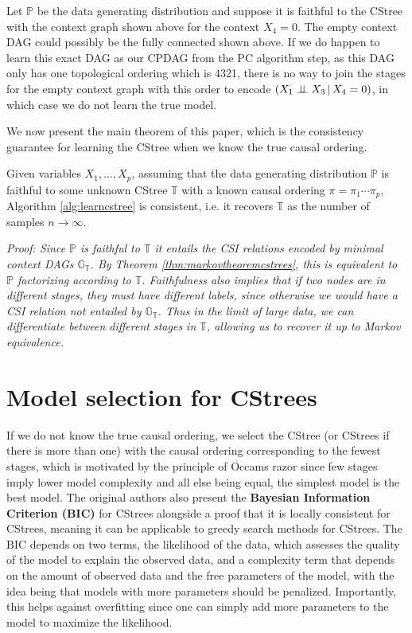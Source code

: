 \documentclass{tufte-book}
\begin{document}
Let \(\mathbb{P}\) be the data generating distribution and suppose it is faithful to the CStree with the context graph shown above for the context \(X_4=0\). The empty context DAG could possibly be the fully connected shown above. If we do happen to learn this exact DAG as our CPDAG from the PC algorithm step, as this DAG only has one topological ordering which is 4321, there is no way to join the stages for the empty context graph with this order to encode \((X_1 \perp \!\!\! \perp X_3 \,|\,X_4=0)\), in which case we do not learn the true model.


We now present the main theorem of this paper, which is the consistency guarantee for learning the CStree when we know the true causal ordering.


\begin{theorem}\label{thm:cstreepccorrectness}
Given variables $X_1,...,X_p$, assuming that the data generating distribution $\mathbb{P}$ is faithful to some unknown CStree $\mathbb{T}$ with a known causal ordering $\pi = \pi_1 \cdots \pi_p$, Algorithm \ref{alg:learncstree} is consistent, i.e. it recovers $\mathbb{T}$ as the number of samples $n \rightarrow \infty$.
\end{theorem}


\textit{Proof:
Since $\mathbb{P}$ is faithful to $\mathbb{T}$ it entails the CSI relations encoded by minimal context DAGs $\mathbb{G}_{\mathbb{T}}$. By Theorem \ref{thm:markovtheoremcstrees}, this is equivalent to $\mathbb{P}$ factorizing according to $\mathbb{T}$. Faithfulness also implies that if two nodes are in different stages, they must have different labels, since otherwise we would have a CSI relation not entailed by $\mathbb{G}_{\mathbb{T}}$. Thus in the limit of large data, we can differentiate between different stages in $\mathbb{T}$, allowing us to recover it up to Markov equivalence.
}

\section{Model selection for CStrees}
\label{sec:org815e5d9}
If we do not know the true causal ordering, we select the CStree (or CStrees if there is more than one) with the causal ordering corresponding to the fewest stages, which is motivated by the principle of Occams razor \cite{pearl-2009-causal} since few stages imply lower model complexity and all else being equal, the simplest model is the best model. The original authors also present the \textbf{Bayesian Information Criterion (BIC)} for CStrees alongside a proof that it is locally consistent for CStrees, meaning it can be applicable to greedy search methods for CStrees. The BIC depends on two terms, the likelihood of the data, which assesses the quality of the model to explain the observed data, and a complexity term that depends on the amount of observed data and the free parameters of the model, with the idea being that models with more parameters should be penalized. Importantly, this helps against overfitting since one can simply add more parameters to the model to maximize the likelihood.
\end{document}
